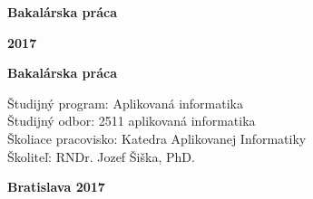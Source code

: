 \begin{center}
\centerline{\LARGE\sc\textbf\skola}
\sc\LARGE\textbf\fakulta
\end{center}

\vspace*{8cm}

\begin{center}
\begin{minipage}{0.8\textwidth}
\begin{center}
 \LARGE\sc\textbf\nazov
 \vspace{1em}
 \centerline{\Large\bf Bakalárska práca}
\end{center}
\end{minipage}
\end{center}

\vfill
\noindent
 {\bf 2017}  \hfill {\bf \autor}
\thispagestyle{empty}



\newpage
\begin{center}
\centerline{\LARGE\sc\textbf\skola}
\sc\LARGE\textbf\fakulta
\end{center}

\vspace*{8cm}

\begin{center}
\begin{minipage}{0.8\textwidth}
\begin{center}
 \LARGE\sc\textbf\nazov 
\end{center}
\vspace{1em}
\centerline{\Large\bf Bakalárska práca}
\end{minipage}
\end{center}

\vspace{5cm}

\selectfont

\noindent
Študijný program: \hspace{0.8em} Aplikovaná informatika\\
Študijný odbor:  \hspace{1.85em} 2511 aplikovaná informatika\\
Školiace pracovisko: Katedra Aplikovanej Informatiky\\
Školiteľ:  \hspace{4.6em} RNDr. Jozef Šiška, PhD.


\vfill
\noindent
{\bf Bratislava 2017}  \hfill {\bf \autor}
\thispagestyle{empty}

\newpage


